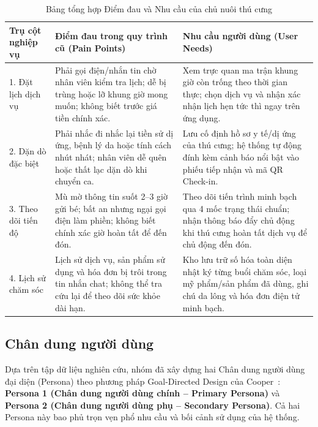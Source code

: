 \begin{table}[H]
\centering
\small
\begin{tabularx}{\textwidth}{|l|X|X|}
\hline
\textbf{Trụ cột nghiệp vụ} & \textbf{Điểm đau trong quy trình cũ (Pain Points)} & \textbf{Nhu cầu người dùng (User Needs)} \\ \hline
1. Đặt lịch dịch vụ & Phải gọi điện/nhắn tin chờ nhân viên kiểm tra lịch; dễ bị trùng hoặc lỡ khung giờ mong muốn; không biết trước giá tiền chính xác. & Xem trực quan ma trận khung giờ còn trống theo thời gian thực; chọn dịch vụ và nhận xác nhận lịch hẹn tức thì ngay trên ứng dụng. \\ \hline
2. Dặn dò đặc biệt & Phải nhắc đi nhắc lại tiền sử dị ứng, bệnh lý da hoặc tính cách nhút nhát; nhân viên dễ quên hoặc thất lạc dặn dò khi chuyển ca. & Lưu cố định hồ sơ y tế/dị ứng của thú cưng; hệ thống tự động đính kèm cảnh báo nổi bật vào phiếu tiếp nhận và mã QR Check-in. \\ \hline
3. Theo dõi tiến độ & Mù mờ thông tin suốt 2--3 giờ gửi bé; bất an nhưng ngại gọi điện làm phiền; không biết chính xác giờ hoàn tất để đến đón. & Theo dõi tiến trình minh bạch qua 4 mốc trạng thái chuẩn; nhận thông báo đẩy chủ động khi thú cưng hoàn tất dịch vụ để chủ động đến đón. \\ \hline
4. Lịch sử chăm sóc & Lịch sử dịch vụ, sản phẩm sử dụng và hóa đơn bị trôi trong tin nhắn chat; không thể tra cứu lại để theo dõi sức khỏe dài hạn. & Kho lưu trữ số hóa toàn diện nhật ký từng buổi chăm sóc, loại mỹ phẩm/sản phẩm đã dùng, ghi chú da lông và hóa đơn điện tử minh bạch. \\ \hline
\end{tabularx}
\caption{Bảng tổng hợp Điểm đau và Nhu cầu của chủ nuôi thú cưng}
\label{tab:user_pain_points}
\end{table}

\subsection{Chân dung người dùng}
Dựa trên tập dữ liệu nghiên cứu, nhóm đã xây dựng hai Chân dung người dùng đại diện (Persona) theo phương pháp Goal-Directed Design của Cooper~\cite{Cooper2004}: \textbf{Persona 1 (Chân dung người dùng chính -- Primary Persona)} và \textbf{Persona 2 (Chân dung người dùng phụ -- Secondary Persona)}. Cả hai Persona này bao phủ trọn vẹn phổ nhu cầu và bối cảnh sử dụng của hệ thống.


